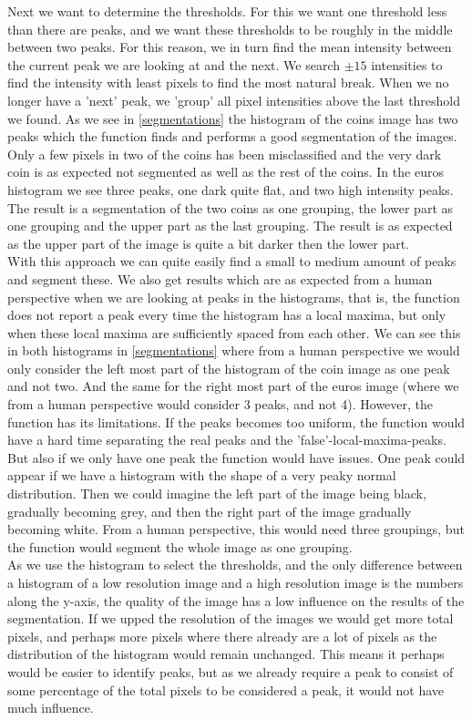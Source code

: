 Next we want to determine the thresholds. For this we want one threshold less than there are peaks, and we want these thresholds to be roughly in the middle between two peaks. For this reason, we in turn find the mean intensity between the current peak we are looking at and the next.  We search $\pm15$ intensities to find the intensity with least pixels to find the most natural break. When we no longer have a 'next' peak, we 'group' all pixel intensities above the last threshold we found. As we see in \autoref{segmentations} the histogram of the coins image has two peaks which the function finds and performs a good segmentation of the images. Only a few pixels in two of the coins has been misclassified and the very dark coin is as expected not segmented as well as the rest of the coins. In the euros histogram we see three peaks, one dark quite flat, and two high intensity peaks. The result is a segmentation of the two coins as one grouping, the lower part as one grouping and the upper part as the last grouping. The result is as expected as the upper part of the image is quite a bit darker then the lower part.\\
With this approach we can quite easily find a small to medium amount of peaks and segment these. We also get results which are as expected from a human perspective when we are looking at peaks in the histograms, that is, the function does not report a peak every time the histogram has a local maxima, but only when these local maxima are sufficiently spaced from each other. We can see this in both histograms in \autoref{segmentations} where from a human perspective we would only consider the left most part of the histogram of the coin image as one peak and not two. And the same for the right most part of the euros image (where we from a human perspective would consider 3 peaks, and not 4). However, the function has its limitations. If the peaks becomes too uniform, the function would have a hard time separating the real peaks and the 'false'-local-maxima-peaks. But also if we only have one peak the function would have issues. One peak could appear if we have a histogram with the shape of a very peaky normal distribution. Then we could imagine the left part of the image being black, gradually becoming grey, and then the right part of the image gradually becoming white. From a human perspective, this would need three groupings, but the function would segment the whole image as one grouping.\\
As we use the histogram to select the thresholds, and the only difference between a histogram of a low resolution image and a high resolution image is the numbers along the y-axis, the quality of the image has a low influence on the results of the segmentation. If we upped the resolution of the images we would get more total pixels, and perhaps more pixels where there already are a lot of pixels as the distribution of the histogram would remain unchanged. This means it perhaps would be easier to identify peaks, but as we already require a peak to consist of some percentage of the total pixels to be considered a peak, it would not have much influence.


